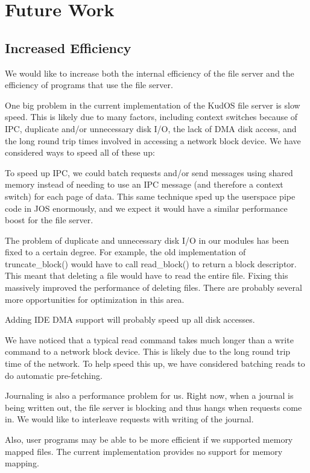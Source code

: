 \section{Future Work}
\label{sec:future}

\subsection{Increased Efficiency}
\label{sec:future:efficiency}

We would like to increase both the internal efficiency of the file server and
the efficiency of programs that use the file server.

One big problem in the current implementation of the KudOS file server is slow
speed. This is likely due to many factors, including context switches because of
IPC, duplicate and/or unnecessary disk I/O, the lack of DMA disk access, and the
long round trip times involved in accessing a network block device. We have
considered ways to speed all of these up:

To speed up IPC, we could batch requests and/or send messages using shared
memory instead of needing to use an IPC message (and therefore a context switch)
for each page of data. This same technique sped up the userspace pipe code in
JOS enormously, and we expect it would have a similar performance boost for the
file server.

The problem of duplicate and unnecessary disk I/O in our modules has been fixed
to a certain degree. For example, the old implementation of truncate\_block()
would have to call read\_block() to return a block descriptor. This meant that
deleting a file would have to read the entire file. Fixing this massively
improved the performance of deleting files. There are probably several more
opportunities for optimization in this area.

Adding IDE DMA support will probably speed up all disk accesses.

We have noticed that a typical read command takes much longer than a write
command to a network block device. This is likely due to the long round trip
time of the network. To help speed this up, we have considered batching reads to
do automatic pre-fetching.

Journaling is also a performance problem for us. Right now, when a journal is
being written out, the file server is blocking and thus hangs when requests come
in. We would like to interleave requests with writing of the journal.

Also, user programs may be able to be more efficient if we supported memory
mapped files. The current implementation provides no support for memory mapping.

